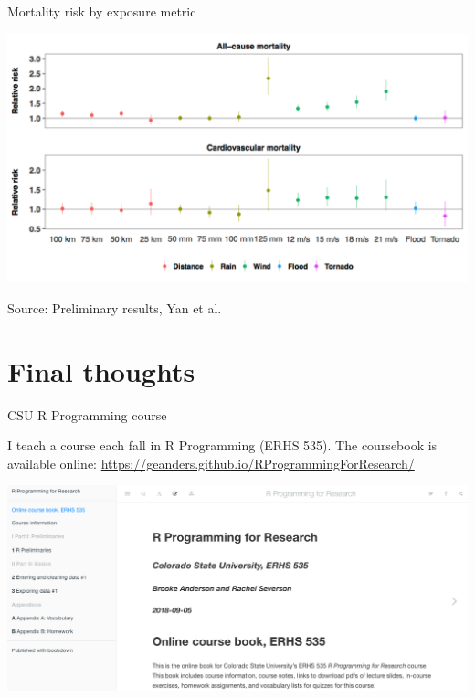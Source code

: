 \documentclass[ignorenonframetext,]{beamer}
\begin{document}
\begin{frame}{Mortality risk by exposure metric}

\begin{center}\includegraphics[width=\textwidth]{figures/rrs_by_metric} \end{center}

\footnotesize Source: Preliminary results, Yan et al.

\end{frame}

\section{Final thoughts}\label{final-thoughts}

\begin{frame}{CSU R Programming course}

I teach a course each fall in R Programming (ERHS 535). The coursebook
is available online:
\url{https://geanders.github.io/RProgrammingForResearch/}

\begin{center}\includegraphics[width=\textwidth]{figures/r_coursebook} \end{center}

\end{frame}
\end{document}

